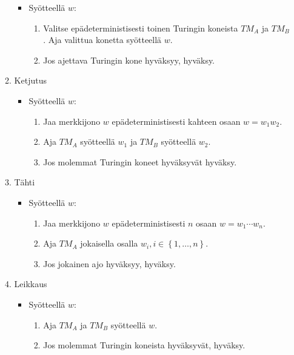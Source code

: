 \documentclass[finnish,11pt]{article}
\newcommand{\set}[1]{{\left\{ #1 \right\}}}
\begin{document}
\begin{enumerate}
\begin{enumerate}
    \begin{itemize}
    \item
      Syötteellä $w$:
      \begin{enumerate}[label=\arabic*.]
      \item
        Valitse epädeterministisesti toinen Turingin koneista $TM_A$ ja
        $TM_B$. Aja valittua konetta syötteellä $w$.
      \item
        Jos ajettava Turingin kone hyväksyy, hyväksy.
      \end{enumerate}
    \end{itemize}
  \item Ketjutus
    \begin{itemize}
    \item
      Syötteellä $w$:
      \begin{enumerate}[label=\arabic*.]
      \item
        Jaa merkkijono $w$ epädeterministisesti kahteen osaan $w = w_1w_2$.
      \item
        Aja $TM_A$ syötteellä $w_1$ ja $TM_B$ syötteellä $w_2$.
      \item
        Jos molemmat Turingin koneet hyväksyvät hyväksy.
      \end{enumerate}
    \end{itemize}
  \item Tähti
    \begin{itemize}
    \item
      Syötteellä $w$:
      \begin{enumerate}[label=\arabic*.]
      \item
        Jaa merkkijono $w$ epädeterministisesti $n$ osaan $w = w_1 \cdots
        w_n$.
      \item
        Aja $TM_A$ jokaisella osalla $w_i, i \in \set{1, \dots, n}$.
      \item
        Jos jokainen ajo hyväksyy, hyväksy.
      \end{enumerate}
    \end{itemize}
  \item Leikkaus
    \begin{itemize}
    \item
      Syötteellä $w$:
      \begin{enumerate}[label=\arabic*.]
      \item
        Aja $TM_A$ ja $TM_B$ syötteellä $w$.
      \item
        Jos molemmat Turingin koneista hyväksyvät, hyväksy.
      \end{enumerate}
    \end{itemize}
  \end{enumerate}
\end{enumerate}
\end{document}
